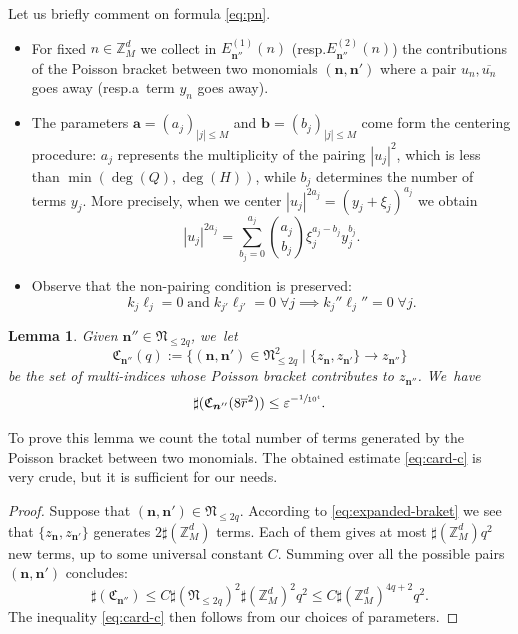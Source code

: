 \documentclass[10pt,a4paper]{amsart}
\providecommand{\resp}{resp.}
\theoremstyle{plain}
\newtheorem{lemma}[theorem]{Lemma}
\theoremstyle{definition}
\newcommand{\nb}{{\boldsymbol n}}
\newcommand{\Nb}{{\boldsymbol{\mathfrak{N}}}}
\newcommand{\Z}{\mathbb{Z}}
\newcommand{\1}{\mathbf{1}}
\let\epsilon\varepsilon
\begin{document}
Let us briefly comment on formula \eqref{eq:pn}.
\begin{itemize}
\item For fixed $n\in\Z_{M}^{d}$ we collect in $E_{\nb''}^{(1)}(n)$ (\resp $E_{\nb''}^{(2)}(n)$) the contributions of the Poisson bracket between two monomials $(\nb,\nb')$ where a pair $u_n,\overline{u_{n}}$ goes away (\resp a~term $y_n$ goes away).
\item The parameters $\boldsymbol{a}=(a_{j})_{|j|\leq M}$ and $\boldsymbol{b}=(b_{j})_{|j|\leq M}$ come form the centering procedure: $a_{j}$ represents the multiplicity of the pairing $|u_{j}|^{2}$, which is less than $\min(\deg(Q),\deg(H))$, while $b_{j}$ determines the number of terms $y_{j}$. More precisely, when we center $|u_j|^{2a_{j}}=(y_{j}+\xi_j)^{a_{j}}$ we obtain
\[
|u_j|^{2a_{j}} = \sum_{b_{j}=0}^{a_{j}} \binom{a_{j}}{b_{j}}\xi_j^{a_{j}-b_{j}}y_j^{b_{j}}.
\]
\item Observe that the non-pairing condition is preserved:
\[
k_{j}\ell_{j}=0\; \text{and}\; k_{j'}\ell_{j'}=0\; \forall j\implies k_{j}''\ell_{j}''=0\; \forall j.
\]
\end{itemize}

\begin{lemma} Given $\nb''\in\Nb_{\leq2q}$, we~let
\[
\mathfrak{C}_{\nb''}(q) := \{ (\nb,\nb')\in\Nb_{\leq 2q}^{2}\mid \{z_{\nb},z_{\nb'}\}\to z_{\nb''}\}
\]
be the set of multi-indices whose Poisson bracket contributes to $z_{\nb''}$. We~have
\begin{equation}
\label{eq:card-c}
\sharp(\mathfrak{C}_{\nb''}(8\overline{r}^{2}))\leq \epsilon^{-\sfrac{1}{10^{4}}}.
\end{equation}
\end{lemma}
To prove this lemma we count the total number of terms generated by the Poisson bracket between two monomials. The obtained estimate \eqref{eq:card-c} is very crude, but it is sufficient for our needs.
\begin{proof} Suppose that $(\nb,\nb')\in\Nb_{\leq 2q}$. According to \eqref{eq:expanded-braket} we see that $\{z_{\nb},z_{\nb'}\}$ generates $2\sharp(\Z_{M}^{d})$ terms. Each of them gives at most $\sharp(\Z_{M}^{d})q^{2}$ new terms, up to some universal constant $C$. Summing over all the possible pairs $(\nb,\nb')$ concludes:
\[
\sharp(\mathfrak{C}_{\nb''})\leq C\sharp(\Nb_{\leq 2q})^{2}\sharp(\Z_{M}^{d})^{2}q^{2}\leq C\sharp(\Z_{M}^{d})^{4q+2}q^{2}.
\]
The inequality \eqref{eq:card-c} then follows from our choices of parameters.
\end{proof}
\end{document}
